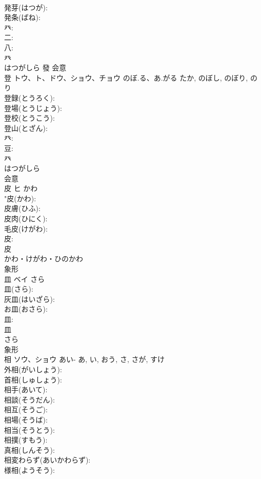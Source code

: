 \documentclass[8pt]{extreport}
\begin{document}
\begin{CJK}{UTF8}{min}
\\	発芽(はつが): 
\\	発条(ばね): 
\\	癶: 
\\	二: 
\\	八: 
\\	癶	
\\	はつがしら	發	会意 
\\	登	トウ、ト、ドウ、ショウ、チョウ	のぼ.る、あ.がる	たか, のぼし, のぼり, のり	
\\	登録(とうろく): 
\\	登場(とうじょう): 
\\	登校(とうこう): 
\\	登山(とざん): 
\\	癶: 
\\	豆: 
\\	癶	
\\	はつがしら	
\\	会意 
\\	皮	ヒ	かわ		
\\	"皮(かわ): 
\\	皮膚(ひふ): 
\\	皮肉(ひにく): 
\\	毛皮(けがわ): 
\\	皮: 
\\	皮	
\\	かわ・けがわ・ひのかわ	
\\	象形 
\\	皿	ベイ	さら		
\\	皿(さら): 
\\	灰皿(はいざら): 
\\	お皿(おさら): 
\\	皿: 
\\	皿	
\\	さら	
\\	象形 
\\	相	ソウ、ショウ	あい-	あ, い, おう, さ, さが, すけ	
\\	外相(がいしょう): 
\\	首相(しゅしょう): 
\\	相手(あいて): 
\\	相談(そうだん): 
\\	相互(そうご): 
\\	相場(そうば): 
\\	相当(そうとう): 
\\	相撲(すもう): 
\\	真相(しんそう): 
\\	相変わらず(あいかわらず): 
\\	様相(ようそう): 

\end{CJK}
\end{document}

